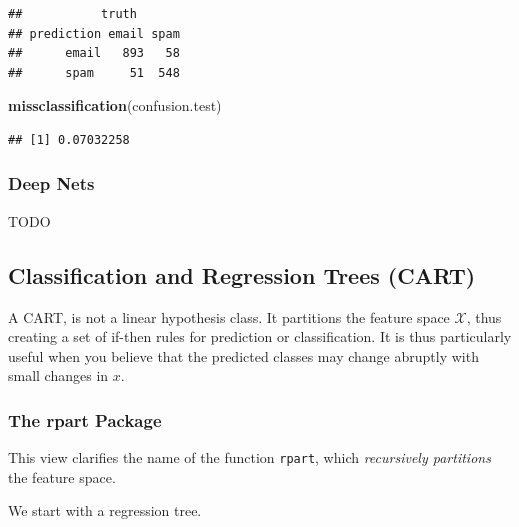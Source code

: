 \documentclass[]{book}
\newenvironment{Shaded}{\begin{snugshade}}{\end{snugshade}}
\newcommand{\KeywordTok}[1]{\textcolor[rgb]{0.13,0.29,0.53}{\textbf{#1}}}
\newcommand{\DataTypeTok}[1]{\textcolor[rgb]{0.13,0.29,0.53}{#1}}
\newcommand{\DecValTok}[1]{\textcolor[rgb]{0.00,0.00,0.81}{#1}}
\newcommand{\StringTok}[1]{\textcolor[rgb]{0.31,0.60,0.02}{#1}}
\newcommand{\CommentTok}[1]{\textcolor[rgb]{0.56,0.35,0.01}{\textit{#1}}}
\newcommand{\OperatorTok}[1]{\textcolor[rgb]{0.81,0.36,0.00}{\textbf{#1}}}
\newcommand{\NormalTok}[1]{#1}
\theoremstyle{definition}
\theoremstyle{definition}
\theoremstyle{definition}
\theoremstyle{remark}
\begin{document}
\begin{verbatim}
##           truth
## prediction email spam
##      email   893   58
##      spam     51  548
\end{verbatim}

\begin{Shaded}
\begin{Highlighting}[]
\KeywordTok{missclassification}\NormalTok{(confusion.test)}
\end{Highlighting}
\end{Shaded}

\begin{verbatim}
## [1] 0.07032258
\end{verbatim}

\subsubsection{Deep Nets}\label{deep-nets}

TODO

\subsection{Classification and Regression Trees
(CART)}\label{classification-and-regression-trees-cart}

A CART, is not a linear hypothesis class. It partitions the feature
space \(\mathcal{X}\), thus creating a set of if-then rules for
prediction or classification. It is thus particularly useful when you
believe that the predicted classes may change abruptly with small
changes in \(x\).

\subsubsection{The rpart Package}\label{the-rpart-package}

This view clarifies the name of the function \texttt{rpart}, which
\emph{recursively partitions} the feature space.

We start with a regression tree.

\begin{Shaded}
\end{Shaded}
\end{document}

